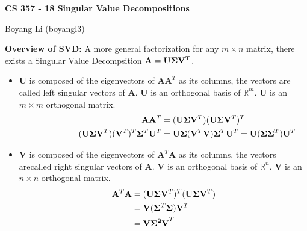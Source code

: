 \documentclass[12pt]{article}
\begin{document}
\begin{center}\Large\bf 
CS 357 - 18 Singular Value Decompositions\\
\end{center}
\begin{center}
Boyang Li (boyangl3)
\end{center}

\medskip
\noindent \textbf{Overview of SVD:} A more general factorization for any $m \times n$ matrix, there exists a Singular Value Decompsition $\bf{A=U{\Sigma}V^T}$.

\begin{itemize}
    \item $\mathbf{U}$ is composed of the eigenvectors of $\mathbf{AA}^T$ as its columns, the vectors are called left singular vectors of $\mathbf{A}$. $\mathbf{U}$ is an orthogonal basis of $\mathbb{R}^m$. $\mathbf{U}$ is an $m \times m$ orthogonal matrix.
    \begin{align*}
        \mathbf{A}\mathbf{A}^T &= ({\bf U} {\bf \Sigma} {\bf V}^T)({\bf U} {\bf \Sigma} {\bf V}^T)^T \\
        \hspace{2cm} ({\bf U} {\bf \Sigma} {\bf V}^T) ({\bf V}^T)^T {\bf \Sigma}^T {\bf U}^T &= {\bf U} {\bf \Sigma} ({\bf V}^T {\bf V}) {\bf \Sigma}^T {\bf U}^T = {\bf U} ({\bf \Sigma} {\bf \Sigma}^T) {\bf U}^T
    \end{align*}
    
    \item $\mathbf{V}$ is composed of the eigenvectors of $\mathbf{A}^T\mathbf{A}$ as its columns, the vectors arecalled right singular vectors of $\mathbf{A}$. $\mathbf{V}$ is an orthogonal basis of $\mathbb{R}^n$. $\mathbf{V}$ is an $n \times n$ orthogonal matrix.
    \begin{align*}
        \mathbf{A}^T\mathbf{A} &= ({\bf U} {\bf \Sigma} {\bf V}^T)^T ({\bf U} {\bf \Sigma} {\bf V}^T) \\
        &= {\bf V} ({\bf \Sigma}^T {\bf \Sigma}) {\bf V}^T \\
        &= \mathbf{V\Sigma^2V}^T
    \end{align*}


\end{itemize}
\end{document}
